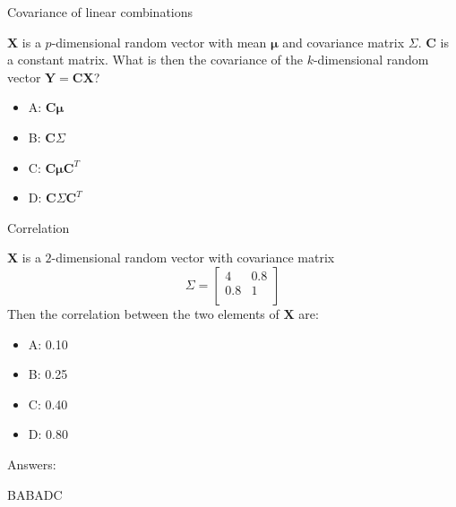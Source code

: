 \documentclass[ignorenonframetext,]{beamer}
\providecommand{\tightlist}{%
  \setlength{\itemsep}{0pt}\setlength{\parskip}{0pt}}
\begin{document}
\begin{frame}

\begin{block}{Covariance of linear combinations}

\(\mathbf{X}\) is a \(p\)-dimensional random vector with mean
\(\mathbf{\mu}\) and covariance matrix \(\Sigma\). \(\mathbf{C}\) is a
constant matrix. What is then the covariance of the \(k\)-dimensional
random vector \(\mathbf{Y}=\mathbf{C}\mathbf{X}\)?

\begin{itemize}
\tightlist
\item
  A: \(\mathbf{C}\mathbf{\mu}\)
\item
  B: \(\mathbf{C}\Sigma\)
\item
  C: \(\mathbf{C}\mathbf{\mu}\mathbf{C}^T\)
\item
  D: \(\mathbf{C}\Sigma\mathbf{C}^T\)
\end{itemize}

\end{block}

\end{frame}

\begin{frame}

\begin{block}{Correlation}

\(\mathbf{X}\) is a \(2\)-dimensional random vector with covariance
matrix \[ \Sigma= \left[\begin{array}{cc}
          4 & 0.8 \\
          0.8 & 1\\
      \end{array}
    \right]\] Then the correlation between the two elements of
\(\mathbf{X}\) are:

\begin{itemize}
\tightlist
\item
  A: 0.10
\item
  B: 0.25
\item
  C: 0.40
\item
  D: 0.80
\end{itemize}

\end{block}

\end{frame}

\begin{frame}

\begin{block}{Answers:}

BABADC

\end{block}

\end{frame}
\end{document}
